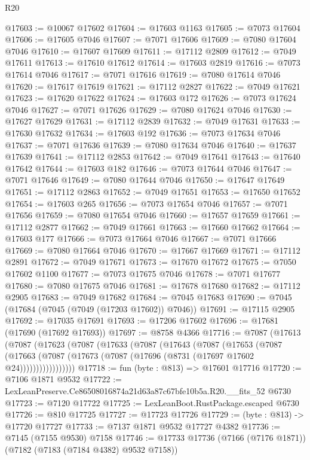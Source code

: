 \begin{lexlean}{R20}
\begin{coremodule}
{@17603 := @10067 @17602
@17604 := @17603 @1163
@17605 := @7073 @17604
@17606 := @17605 @7046
@17607 := @7071 @17606
@17609 := @7080 @17604 @7046
@17610 := @17607 @17609
@17611 := @17112 @2809
@17612 := @7049 @17611
@17613 := @17610 @17612
@17614 := @17603 @2819
@17616 := @7073 @17614 @7046
@17617 := @7071 @17616
@17619 := @7080 @17614 @7046
@17620 := @17617 @17619
@17621 := @17112 @2827
@17622 := @7049 @17621
@17623 := @17620 @17622
@17624 := @17603 @172
@17626 := @7073 @17624 @7046
@17627 := @7071 @17626
@17629 := @7080 @17624 @7046
@17630 := @17627 @17629
@17631 := @17112 @2839
@17632 := @7049 @17631
@17633 := @17630 @17632
@17634 := @17603 @192
@17636 := @7073 @17634 @7046
@17637 := @7071 @17636
@17639 := @7080 @17634 @7046
@17640 := @17637 @17639
@17641 := @17112 @2853
@17642 := @7049 @17641
@17643 := @17640 @17642
@17644 := @17603 @182
@17646 := @7073 @17644 @7046
@17647 := @7071 @17646
@17649 := @7080 @17644 @7046
@17650 := @17647 @17649
@17651 := @17112 @2863
@17652 := @7049 @17651
@17653 := @17650 @17652
@17654 := @17603 @265
@17656 := @7073 @17654 @7046
@17657 := @7071 @17656
@17659 := @7080 @17654 @7046
@17660 := @17657 @17659
@17661 := @17112 @2877
@17662 := @7049 @17661
@17663 := @17660 @17662
@17664 := @17603 @177
@17666 := @7073 @17664 @7046
@17667 := @7071 @17666
@17669 := @7080 @17664 @7046
@17670 := @17667 @17669
@17671 := @17112 @2891
@17672 := @7049 @17671
@17673 := @17670 @17672
@17675 := @7050 @17602 @1100
@17677 := @7073 @17675 @7046
@17678 := @7071 @17677
@17680 := @7080 @17675 @7046
@17681 := @17678 @17680
@17682 := @17112 @2905
@17683 := @7049 @17682
@17684 := @7045 @17683
@17690 := @7045 (@17684 (@7045 (@7049 (@17203 @17602)) @7046))
@17691 := @17115 @2905
@17692 := @17035 @17691
@17693 := @17206 @17602
@17696 := @17681 (@17690 (@17692 @17693))
@17697 := @8758 @4366
@17716 := @7087
    (@17613
      (@7087
        (@17623
          (@7087
            (@17633
              (@7087
                (@17643
                  (@7087
                    (@17653
                      (@7087
                        (@17663
                          (@7087 (@17673 (@7087 (@17696 (@8731 (@17697 @17602 @24)))))))))))))))))
@17718 := fun (byte : @813) => @17601 @17716
@17720 := @7106 @1871 @9532
@17722 := LexLeanPreserve.Ce86508016874a21d63a87c67bfe10b5a.R20.__fits_52 @6730
@17723 := @7120 @17722
@17725 := LexLeanBoot.RustPackage.escaped @6730
@17726 := @810 @17725
@17727 := @17723 @17726
@17729 := (byte : @813) -> @17720 @17727
@17733 := @7137 @1871 @9532 @17727 @4382
@17736 := @7145 (@7155 @9530) @7158
@17746 := @17733 @17736 (@7166 (@7176 @1871)) (@7182 (@7183 (@7184 @4382) @9532 @7158))
}
\end{coremodule}
\end{lexlean}
